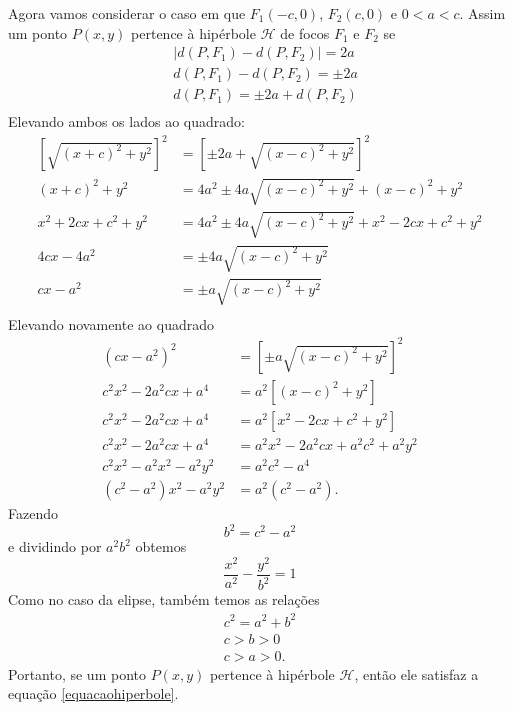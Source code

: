 Agora vamos considerar o caso em que $F_1(-c,0)$, $F_2(c,0)$ e $0 < a < c$. Assim um ponto $P(x,y)$ pertence à hipérbole $\mathcal{H}$ de focos $F_1$ e
$F_2$ se
\begin{align*}
     & | d(P,F_1) - d(P,F_2) | = 2a \\
     & d(P,F_1) - d(P,F_2) = \pm 2a \\
     & d(P,F_1) = \pm 2a + d(P,F_2) \\
\end{align*}
Elevando ambos os lados ao quadrado:
\begin{align*}
    \left[\sqrt{(x + c)^2 + y^2}\right]^2 & = \left[\pm 2a + \sqrt{(x - c)^2 + y^2}\right]^2            \\
    (x + c)^2 + y^2                       & = 4a^2 \pm 4a\sqrt{(x - c)^2 + y^2} + (x - c)^2 + y^2       \\
    x^2 + 2cx + c^2 + y^2                 & = 4a^2 \pm 4a\sqrt{(x - c)^2 + y^2} + x^2 - 2cx + c^2 + y^2 \\
    4cx - 4a^2                            & = \pm 4a\sqrt{(x - c)^2 + y^2}                              \\
    cx - a^2                              & = \pm a\sqrt{(x - c)^2 + y^2}                               \\
\end{align*}
Elevando novamente ao quadrado
\begin{align*}
    (cx - a^2)^2             & = \left[\pm a\sqrt{(x - c)^2 + y^2}\right]^2 \\
    c^2x^2 - 2a^2cx + a^4    & = a^2[(x - c)^2 + y^2]                       \\
    c^2x^2 - 2a^2cx + a^4    & = a^2[x^2 - 2cx + c^2 + y^2]                 \\
    c^2x^2 - 2a^2cx + a^4    & = a^2x^2 - 2a^2cx + a^2c^2 + a^2y^2          \\
    c^2x^2 - a^2x^2 - a^2y^2 & = a^2c^2 - a^4                               \\
    (c^2 - a^2)x^2 - a^2y^2  & = a^2(c^2 - a^2).
\end{align*}
Fazendo
\begin{equation}\label{relacaoauxiliarhiperbole}
    b^2 = c^2 - a^2
\end{equation}
e dividindo por $a^2b^2$ obtemos
\begin{equation}\label{equacaohiperbole}
    \dfrac{x^2}{a^2} - \dfrac{y^2}{b^2} = 1
\end{equation}
Como no caso da elipse, também temos as relações
\begin{align}
    c^2 = a^2 + b^2                     \\
    c > b > 0\label{pitagorashiperbole} \\
    c > a > 0.
\end{align}
Portanto, se um ponto $P(x,y)$ pertence à hipérbole $\mathcal{H}$, então ele satisfaz a equação \eqref{equacaohiperbole}.

